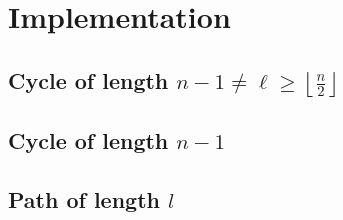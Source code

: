 
\chapter{Implementation}

\section{Cycle of length $n - 1 \neq \ell \geq \left \lfloor \frac{n}{2} \right \rfloor$}

\section{Cycle of length $n - 1$}

\section{Path of length $l$}
